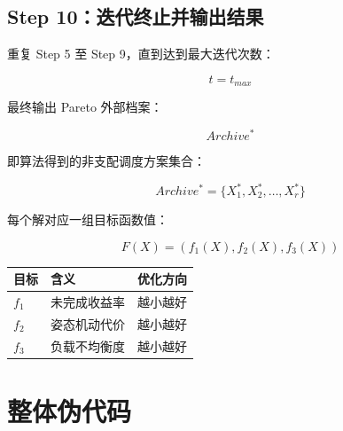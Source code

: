 \documentclass[UTF8,a4paper,12pt]{ctexart}
\begin{document}
\subsection{Step 10：迭代终止并输出结果}

重复 Step 5 至 Step 9，直到达到最大迭代次数：

\begin{equation}
t=t_{max}
\end{equation}

最终输出 Pareto 外部档案：

\begin{equation}
Archive^*
\end{equation}

即算法得到的非支配调度方案集合：

\begin{equation}
Archive^*=\{X_1^*,X_2^*,\dots,X_r^*\}
\end{equation}

每个解对应一组目标函数值：

\begin{equation}
F(X)=\left(f_1(X),f_2(X),f_3(X)\right)
\end{equation}

\begin{center}
\begin{tabular}{lll}
\toprule
目标 & 含义 & 优化方向 \\
\midrule
$f_1$ & 未完成收益率 & 越小越好 \\
$f_2$ & 姿态机动代价 & 越小越好 \\
$f_3$ & 负载不均衡度 & 越小越好 \\
\bottomrule
\end{tabular}
\end{center}

\newpage

\section{整体伪代码}
\end{document}

